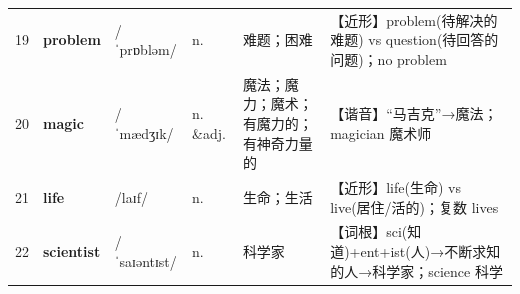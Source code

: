 \documentclass[UTF8,a4paper,11pt,oneside]{ctexbook}
\newcommand{\cellword}[1]{{\bfseries\textcolor{wordcol}{#1}}}
\newcommand{\cellipa}[1]{{\footnotesize\textcolor{ipacol}{#1}}}
\newcommand{\cellpos}[1]{\textcolor{poscol}{#1}}
\newcommand{\cellno}[1]{\textcolor{volcolor!75!black}{#1}}
\begin{document}
{\begin{longtable}{@{}C{0.045\textwidth}L{0.155\textwidth}L{0.175\textwidth}C{0.070\textwidth}L{0.180\textwidth}L{0.282\textwidth}@{}}
 \cellno{19} & \cellword{problem} & \cellipa{/ˈprɒbləm/} & \cellpos{n.} & 难题；困难 & \textcolor{tagNear}{【近形】}problem(待解决的难题) vs question(待回答的问题)；no problem \\
\cellno{20} & \cellword{magic} & \cellipa{/ˈmædʒɪk/} & \cellpos{n. \&adj.} & 魔法；魔力；魔术；有魔力的；有神奇力量的 & \textcolor{tagSound}{【谐音】}“马吉克”→\allowbreak{}魔法；magician 魔术师 \\
 \cellno{21} & \cellword{life} & \cellipa{/laɪf/} & \cellpos{n.} & 生命；生活 & \textcolor{tagNear}{【近形】}life(生命) vs live(居住/活的)；复数 lives \\
\cellno{22} & \cellword{scientist} & \cellipa{/ˈsaɪəntɪst/} & \cellpos{n.} & 科学家 & \textcolor{tagRoot}{【词根】}sci(知道)+ent+ist(人)→\allowbreak{}不断求知的人→\allowbreak{}科学家；science 科学 \\
\end{longtable}
}

\end{document}
